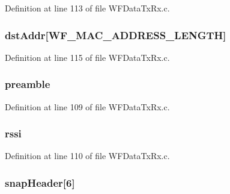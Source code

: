 Definition at line 113 of file W\+F\+Data\+Tx\+Rx.\+c.

\hypertarget{structt_w_f_rx_data_indicate_ab8a017e9ada48f6b2887e632e5a61b89}{}
\subsubsection[{dst\+Addr}]{ dst\+Addr\mbox{[}W\+F\+\_\+\+M\+A\+C\+\_\+\+A\+D\+D\+R\+E\+S\+S\+\_\+\+L\+E\+N\+G\+T\+H\mbox{]}}\label{structt_w_f_rx_data_indicate_ab8a017e9ada48f6b2887e632e5a61b89}


Definition at line 115 of file W\+F\+Data\+Tx\+Rx.\+c.

\hypertarget{structt_w_f_rx_data_indicate_a5b64b4a91ade7dc3b8f50370b41beea5}{}
\subsubsection[{preamble}]{ preamble}\label{structt_w_f_rx_data_indicate_a5b64b4a91ade7dc3b8f50370b41beea5}


Definition at line 109 of file W\+F\+Data\+Tx\+Rx.\+c.

\hypertarget{structt_w_f_rx_data_indicate_a640aff00cf10c51413e56e7846dc5089}{}
\subsubsection[{rssi}]{ rssi}\label{structt_w_f_rx_data_indicate_a640aff00cf10c51413e56e7846dc5089}


Definition at line 110 of file W\+F\+Data\+Tx\+Rx.\+c.

\hypertarget{structt_w_f_rx_data_indicate_a07518744b6a23e1e00d1439bc5f5f9cf}{}
\subsubsection[{snap\+Header}]{ snap\+Header\mbox{[}6\mbox{]}}\label{structt_w_f_rx_data_indicate_a07518744b6a23e1e00d1439bc5f5f9cf}


